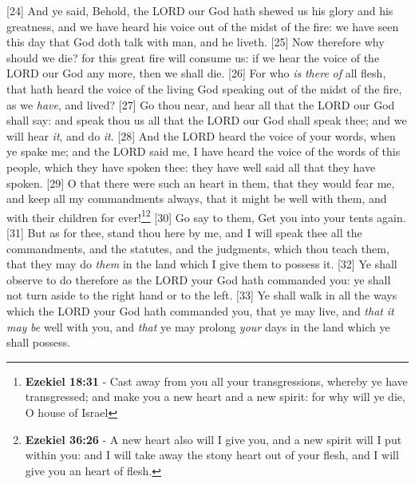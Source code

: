 [24] \textcolor[cmyk]{0.99998,1,0,0}{And ye said, Behold, the LORD our God hath shewed us his glory and his greatness, and we have heard his voice out of the midst of the fire: we have seen this day that God doth talk with man, and he liveth.}
[25] \textcolor[cmyk]{0.99998,1,0,0}{Now therefore why should we die? for this great fire will   {consume} us: if we hear the voice of the LORD our God any more, then we shall die.}
[26] \textcolor[cmyk]{0.99998,1,0,0}{For who \emph{is} \emph{there} \emph{of} all flesh, that hath heard the voice of the living God speaking out of the midst of the fire, as we \emph{have}, and lived?}
[27] \textcolor[cmyk]{0.99998,1,0,0}{Go thou near, and hear all that the LORD our God shall say: and speak thou   us all that the LORD our God shall speak   thee; and we will hear \emph{it}, and do \emph{it}.}
[28] \textcolor[cmyk]{0.99998,1,0,0}{And the LORD heard the voice of your words, when ye spake   me; and the LORD said   me, I have heard the voice of the words of this people, which they have spoken   thee: they have well said all that they have spoken.}
[29] \textcolor[cmyk]{0.99998,1,0,0}{O that there were such an heart in them, that they would fear me, and keep all my commandments always, that it might be well with them, and with their children for ever!}\footnote{\textbf{Ezekiel 18:31} - Cast away from you all your transgressions, whereby ye have transgressed; and make you a new heart and a new spirit: for why will ye die, O house of Israel}\footnote{\textbf{Ezekiel 36:26} - A new heart also will I give you, and a new spirit will I put within you: and I will take away the stony heart out of your flesh, and I will give you an heart of flesh.}
[30] \textcolor[cmyk]{0.99998,1,0,0}{Go say to them, Get you into your tents again.}
[31] \textcolor[cmyk]{0.99998,1,0,0}{But as for thee, stand thou here by me, and I will speak   thee all the commandments, and the statutes, and the judgments, which thou   teach them, that they may do \emph{them} in the land which I give them to possess it.}
[32] \textcolor[cmyk]{0.99998,1,0,0}{Ye shall observe to do therefore as the LORD your God hath commanded you: ye shall not turn aside to the right hand or to the left.}
[33] \textcolor[cmyk]{0.99998,1,0,0}{Ye shall walk in all the ways which the LORD your God hath commanded you, that ye may live, and \emph{that} \emph{it} \emph{may} \emph{be} well with you, and \emph{that} ye may prolong \emph{your} days in the land which ye shall possess.}

